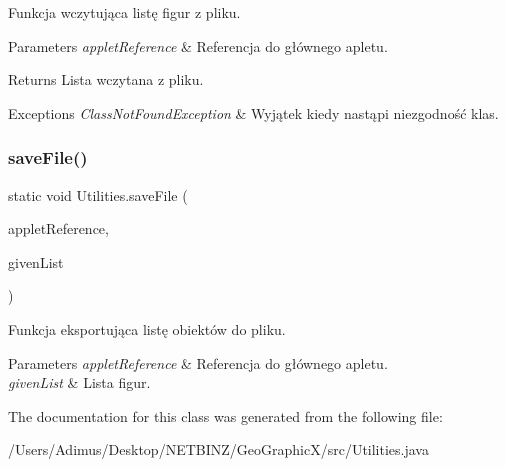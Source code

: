 Funkcja wczytująca listę figur z pliku. 
\begin{DoxyParams}{Parameters}
{\em applet\+Reference} & Referencja do głównego apletu. \\
\hline
\end{DoxyParams}
\begin{DoxyReturn}{Returns}
Lista wczytana z pliku. 
\end{DoxyReturn}

\begin{DoxyExceptions}{Exceptions}
{\em Class\+Not\+Found\+Exception} & Wyjątek kiedy nastąpi niezgodność klas. \\
\hline
\end{DoxyExceptions}
\mbox{\label{class_utilities_a2e7fabe3109d97ded6a995c15657d487}} 
\subsubsection{save\+File()}
{\footnotesize\ttfamily static void Utilities.\+save\+File (\begin{DoxyParamCaption}\item[{\textbf{ Geo\+GraphicX}}]{applet\+Reference,  }\item[{Array\+List$<$ \textbf{ Shape\+Base} $>$}]{given\+List }\end{DoxyParamCaption})\hspace{0.3cm}{\ttfamily [static]}}

Funkcja eksportująca listę obiektów do pliku. 
\begin{DoxyParams}{Parameters}
{\em applet\+Reference} & Referencja do głównego apletu. \\
\hline
{\em given\+List} & Lista figur. \\
\hline
\end{DoxyParams}


The documentation for this class was generated from the following file\+:\begin{DoxyCompactItemize}
\item 
/\+Users/\+Adimus/\+Desktop/\+N\+E\+T\+B\+I\+N\+Z/\+Geo\+Graphic\+X/src/Utilities.\+java\end{DoxyCompactItemize}
